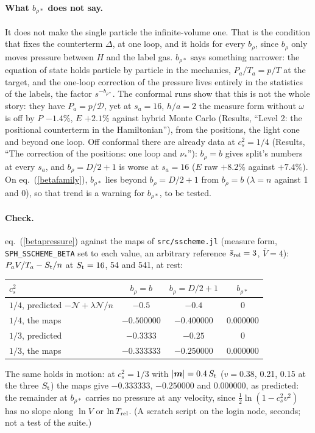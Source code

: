\documentclass[11pt,aps,preprint,nofootinbib,superscriptaddress,tightenlines]{revtex4-2}
\def\Eq#1{eq.~(\ref{#1})}
\let\oldparagraph\paragraph
\renewcommand{\paragraph}{\par\bigskip\oldparagraph}
\begin{document}
\paragraph{What $b_{\rho*}$ does not say.}  It does not make the single particle the infinite-volume one.  That is the condition that fixes the
counterterm $\Delta$, at one loop, and it holds for every $b_\rho$, since $b_\rho$ only moves pressure between $H$ and the label gas.  $b_{\rho*}$ says
something narrower: the equation of state holds particle by particle in the mechanics, $P_a/T_a=p/T$ at the target, and the one-loop correction
of the pressure lives entirely in the statistics of the labels, the factor $s^{-b_{\rho*}}$.  The conformal runs show that this is not the whole
story: they have $P_a=p/\mathcal D$, yet at $s_a=16$, $h/a=2$ the measure form without $\omega$ is off by $P$ $-1.4\%$, $E$ $+2.1\%$ against hybrid
Monte Carlo (Results, ``Level 2: the positional counterterm in the Hamiltonian''), from the positions, the light cone and beyond one loop.  Off conformal there are already data at
$c_s^2=1/4$ (Results, ``The correction of the positions: one loop and $\nu_*$''): $b_\rho=b$ gives split's numbers at every $s_a$, and $b_\rho=D/2+1$ is worse at $s_a=16$ ($E$ raw $+8.2\%$
against $+7.4\%$).  On \Eq{betafamily}, $b_{\rho*}$ lies beyond $b_\rho=D/2+1$ from $b_\rho=b$ ($\lambda=n$ against 1 and 0), so that trend is a warning
for $b_{\rho*}$, to be tested.

\paragraph{Check.}  \Eq{betapressure} against the maps of \nolinkurl{src/sscheme.jl} (measure form, \texttt{SPH\_SSCHEME\_BETA} set to each
value, an arbitrary reference $\bar s_{\rm rel}=3$, $\bar V=4$): $P_aV/T_a-S_{\rm t}/n$ at $S_{\rm t}=16$, 54 and 541, at rest:
\begin{center}
\begin{tabular}{lccc}
\toprule
$c_s^2$ & $b_\rho=b$ & $b_\rho=D/2+1$ & $b_{\rho*}$ \\
\midrule
$1/4$, predicted $-\mathcal N+\lambda\mathcal N/n$ & $-0.5$ & $-0.4$ & $0$ \\
$1/4$, the maps & $-0.500000$ & $-0.400000$ & $0.000000$ \\
$1/3$, predicted & $-0.3333$ & $-0.25$ & $0$ \\
$1/3$, the maps & $-0.333333$ & $-0.250000$ & $0.000000$ \\
\bottomrule
\end{tabular}
\end{center}
The same holds in motion: at $c_s^2=1/3$ with $|\bm m|=0.4\,S_{\rm t}$ ($v=0.38$, 0.21, 0.15 at the three $S_{\rm t}$) the maps give $-0.333333$,
$-0.250000$ and $0.000000$, as predicted: the remainder at $b_{\rho*}$ carries no pressure at any velocity, since $\tfrac12\ln(1-c_s^2v^2)$ has no
slope along $\ln V$ or $\ln T_{\rm rel}$.  (A scratch script on the login node, seconds; not a test of the suite.)
\end{document}
